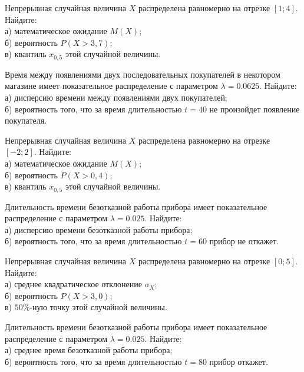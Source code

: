 \vfill

\newpage\setcounter{zad}{0}

\z Непрерывная случайная величина $X$ распределена равномерно на отрезке $[1; 4]$. Найдите: \\ \quad а) математическое ожидание $M(X)$; \\ \quad б) вероятность $P(X>3{,}7)$; \\ \quad в) квантиль $x_{0{,}5}$ этой случайной величины.


\vfill

\z Время между появлениями двух последовательных покупателей в некотором магазине имеет показательное распределение с параметром $\lambda = 0.0625$. Найдите: \\ \quad а) дисперсию времени между появлениями двух покупателей; \\ \quad б) вероятность того, что за время длительностью $t = 40$ не произойдет появление покупателя.
 

\vfill

\newpage\setcounter{zad}{0}

\z Непрерывная случайная величина $X$ распределена равномерно на отрезке $[-2; 2]$. Найдите: \\ \quad а) математическое ожидание $M(X)$; \\ \quad б) вероятность $P(X>0{,}4)$; \\ \quad в) квантиль $x_{0{,}5}$ этой случайной величины.


\vfill

\z Длительность времени безотказной работы прибора имеет показательное распределение с параметром $\lambda = 0.025$. Найдите: \\ \quad а) дисперсию времени безотказной работы прибора; \\ \quad б) вероятность того, что за время длительностью $t = 60$ прибор не откажет.
 

\vfill

\newpage\setcounter{zad}{0}

\z Непрерывная случайная величина $X$ распределена равномерно на отрезке $[0; 5]$. Найдите: \\ \quad а) среднее квадратическое отклонение $\sigma_X$; \\ \quad б) вероятность $P(X>3{,}0)$; \\ \quad в) $50\%$-ную точку этой случайной величины.


\vfill

\z Длительность времени безотказной работы прибора имеет показательное распределение с параметром $\lambda = 0.025$. Найдите: \\ \quad а) среднее время безотказной работы прибора; \\ \quad б) вероятность того, что за время длительностью $t = 80$ прибор  откажет.
 

